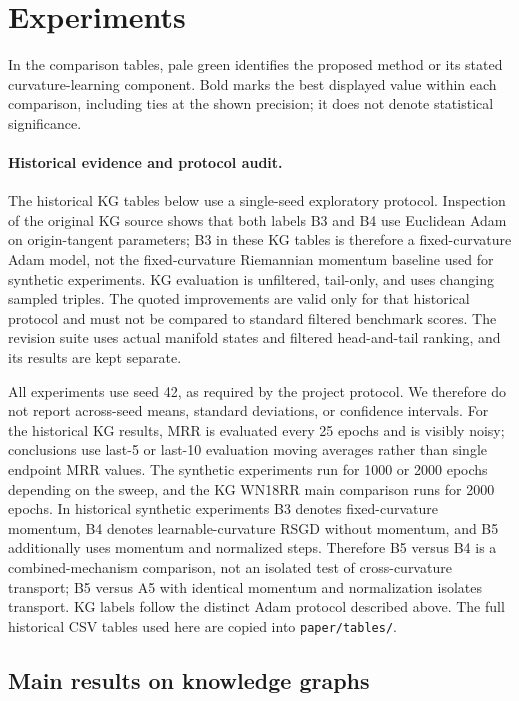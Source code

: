 \section{Experiments}
\label{sec:experiments}
In the comparison tables, pale green identifies the proposed method or its stated curvature-learning component. Bold marks the best displayed value within each comparison, including ties at the shown precision; it does not denote statistical significance.
\paragraph{Historical evidence and protocol audit.}
The historical KG tables below use a single-seed exploratory protocol. Inspection of the original KG source shows that both labels B3 and B4 use Euclidean Adam on origin-tangent parameters; B3 in these KG tables is therefore a fixed-curvature Adam model, not the fixed-curvature Riemannian momentum baseline used for synthetic experiments. KG evaluation is unfiltered, tail-only, and uses changing sampled triples. The quoted improvements are valid only for that historical protocol and must not be compared to standard filtered benchmark scores. The revision suite uses actual manifold states and filtered head-and-tail ranking, and its results are kept separate.\par


All experiments use seed 42, as required by the project protocol. We therefore do not report across-seed means, standard deviations, or confidence intervals. For the historical KG results, MRR is evaluated every 25 epochs and is visibly noisy; conclusions use last-5 or last-10 evaluation moving averages rather than single endpoint MRR values. The synthetic experiments run for 1000 or 2000 epochs depending on the sweep, and the KG WN18RR main comparison runs for 2000 epochs. In historical synthetic experiments B3 denotes fixed-curvature momentum, B4 denotes learnable-curvature RSGD without momentum, and B5 additionally uses momentum and normalized steps. Therefore B5 versus B4 is a combined-mechanism comparison, not an isolated test of cross-curvature transport; B5 versus A5 with identical momentum and normalization isolates transport. KG labels follow the distinct Adam protocol described above. The full historical CSV tables used here are copied into \texttt{paper/tables/}.

\subsection{Main results on knowledge graphs}

